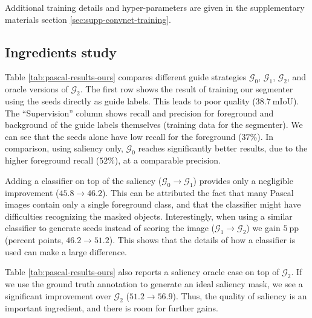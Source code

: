 \documentclass[british,10pt,twocolumn,letterpaper]{article}
\begin{document}
Additional training details and hyper-parameters are given in the
supplementary materials section \ref{sec:supp-convnet-training}.


\subsection{\label{subsec:Ingredients-study}Ingredients study}

 \noindent Table \ref{tab:pascal-results-ours} compares different
 guide strategies $\mathcal{G}_{0}$, $\mathcal{G}_{1}$, $\mathcal{G}_{2}$,
 and oracle versions of $\mathcal{G}_{2}$. The first row shows the
 result of training our segmenter using the seeds directly as guide
 labels. This leads to poor quality ($38.7\ \mbox{mIoU}$). The ``Supervision''
column shows recall and precision for foreground and background of
the guide labels themselves (training data for the segmenter). We
can see that the seeds alone have low recall for the foreground ($37\%$).
In comparison, using saliency only, $\mathcal{G}_{0}$ reaches significantly
better results, due to the higher foreground recall ($52\%$), at
a comparable precision.

Adding a classifier on top of the saliency ($\mathcal{G}_{0}\rightarrow\mathcal{G}_{1}$)
provides only a negligible improvement ($45.8\rightarrow46.2$). This
can be attributed the fact that many Pascal images contain only a
single foreground class, and that the classifier might have difficulties
recognizing the masked objects. Interestingly, when using a similar
classifier to generate seeds instead of scoring the image ($\mathcal{G}_{1}\rightarrow\mathcal{G}_{2}$)
we gain $5\ \text{pp}$ (percent points, $46.2\rightarrow51.2$).
This shows that the details of how a classifier is used can make a
large difference. 

Table \ref{tab:pascal-results-ours} also reports a saliency oracle
case on top of $\mathcal{G}_{2}$. If we use the ground truth annotation
 to generate an ideal saliency mask, we see a significant improvement
 over $\mathcal{G}_{2}$ ($51.2\rightarrow56.9$). Thus, the quality
 of saliency is an important ingredient, and there is room for further
 gains.
\end{document}

